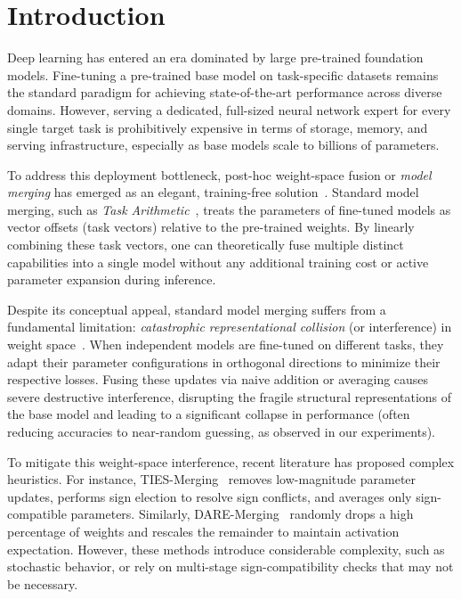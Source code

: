 \section{Introduction}
\label{sec:intro}

Deep learning has entered an era dominated by large pre-trained foundation models. Fine-tuning a pre-trained base model on task-specific datasets remains the standard paradigm for achieving state-of-the-art performance across diverse domains. However, serving a dedicated, full-sized neural network expert for every single target task is prohibitively expensive in terms of storage, memory, and serving infrastructure, especially as base models scale to billions of parameters. 

To address this deployment bottleneck, post-hoc weight-space fusion or \emph{model merging} has emerged as an elegant, training-free solution~\cite{wortsman2022model,ilharco2022editing}. Standard model merging, such as \emph{Task Arithmetic}~\cite{ilharco2022editing}, treats the parameters of fine-tuned models as vector offsets (task vectors) relative to the pre-trained weights. By linearly combining these task vectors, one can theoretically fuse multiple distinct capabilities into a single model without any additional training cost or active parameter expansion during inference.

Despite its conceptual appeal, standard model merging suffers from a fundamental limitation: \emph{catastrophic representational collision} (or interference) in weight space~\cite{yadav2023ties}. When independent models are fine-tuned on different tasks, they adapt their parameter configurations in orthogonal directions to minimize their respective losses. Fusing these updates via naive addition or averaging causes severe destructive interference, disrupting the fragile structural representations of the base model and leading to a significant collapse in performance (often reducing accuracies to near-random guessing, as observed in our experiments).

To mitigate this weight-space interference, recent literature has proposed complex heuristics. For instance, TIES-Merging~\cite{yadav2023ties} removes low-magnitude parameter updates, performs sign election to resolve sign conflicts, and averages only sign-compatible parameters. Similarly, DARE-Merging~\cite{yu2023language} randomly drops a high percentage of weights and rescales the remainder to maintain activation expectation. However, these methods introduce considerable complexity, such as stochastic behavior, or rely on multi-stage sign-compatibility checks that may not be necessary. 

